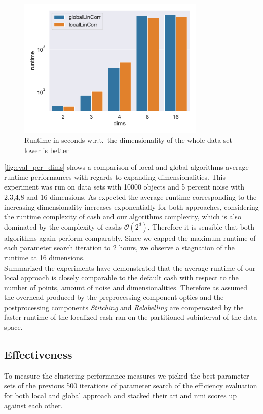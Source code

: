 \begin{figure}[h]
    \centering
        \includegraphics[width=0.8\textwidth]{evaluation/per_dims/Avg_Runtime_O10000_N5_pdims_log.pdf}
    \caption{Runtime in seconds w.r.t.\ the dimensionality of the whole data set - lower is better}
    \label{fig:eval_per_dims}
\end{figure}

\autoref{fig:eval_per_dims} shows a comparison of local and global algorithms average runtime performances with regards to expanding dimensionalities. This experiment was run on data sets with 10000 objects and 5 percent noise with 2,3,4,8 and 16 dimensions. As expected the average runtime corresponding to the increasing dimensionality increases exponentially for both approaches, considering the runtime complexity of \gls{cash} and our algorithms complexity, which is also dominated by the complexity of \gls{cash}s $\mathcal{O}(2^d)$. Therefore it is sensible that both algorithms again perform comparably.
Since we capped the maximum runtime of each parameter search iteration to 2 hours, we observe a stagnation of the runtime at 16 dimensions.\\

Summarized the experiments have demonstrated that the average runtime of our local approach is closely comparable to the default \gls{cash} with respect to the number of points, amount of noise and dimensionalities. Therefore as assumed the overhead produced by the preprocessing component \gls{optics} and the postprocessing components \textit{Stitching} and \textit{Relabelling} are compensated by the faster runtime of the localized \gls{cash} ran on the partitioned subinterval of the data space. 
 
\subsection{Effectiveness}
To measure the clustering performance measures we picked the best parameter sets of the previous 500 iterations of parameter search of the efficiency evaluation for both local and global approach and stacked their \gls{ari} and \gls{nmi} scores up against each other. 

